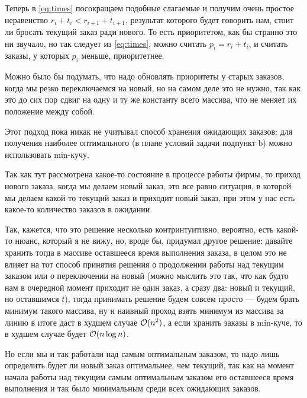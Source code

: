 \begin{upd}
\begin{remark}
    \end{remark}
    Теперь в \eqref{eq:times} посокращаем подобные слагаемые и получим очень простое неравенство $r_i + t_i < r_{i+1} + t_{i+1}$, результат которого будет говорить нам, стоит ли бросать текущий заказ ради нового. То есть приоритетом, как бы странно это ни звучало, но так следует из \eqref{eq:times}, можно считать $p_i = r_i + t_i$, и считать заказы, у которых $p_i$ меньше, приоритетнее.
    \begin{remark}
        Можно было бы подумать, что надо обновлять приоритеты у старых заказов, когда мы резко переключаемся на новый, но на самом деле это не нужно, так как это до сих пор сдвиг на одну и ту же константу всего массива, что не меняет их положение между собой.
    \end{remark}
    \begin{remark}
        Этот подход пока никак не учитывал способ хранения ожидающих заказов: для получения наиболее оптимального (в плане условий задачи подпункт b) можно использовать min-кучу.
    \end{remark}
    \begin{remark}
        Так как тут рассмотрена какое-то состояние в процессе работы фирмы, то приход нового заказа, когда мы делаем новый заказ, это все равно ситуация, в которой мы делаем какой-то текущий заказ и приходит новый заказ, при этом у нас есть какое-то количество заказов в ожидании.
    \end{remark}
\end{upd}
\begin{upd}
    Так, кажется, что это решение несколько контринтуитивно, вероятно, есть какой-то нюанс, который я не вижу, но, вроде бы, придумал другое решение: давайте хранить тогда в массиве оставшееся время выполнения заказа, в целом это не влияет на тот способ принятия решения о продолжении работы над текущим заказом или о переключении на новый (можно мыслить это так, что как будто нам в очередной момент приходит не один заказ, а сразу два: новый и текущий, но оставшимся $t$), тогда принимать решение будем совсем просто --- будем брать минимум такого массива, ну и наивный проход взять минимум из массива за линию в итоге даст в худшем случае $\mathcal{O}(n^2)$, а если хранить заказы в min-куче, то в худшем случае будет $\mathcal{O}(n\log n)$.
    \begin{remark}
        Но если мы и так работали над самым оптимальным заказом, то надо лишь определить будет ли новый заказ оптимальнее, чем текущий, так как на момент начала работы над текущим самым оптимальным заказом его оставшееся время выполнения и так было минимальным среди всех ожидающих заказов.
    \end{remark}
\end{upd}